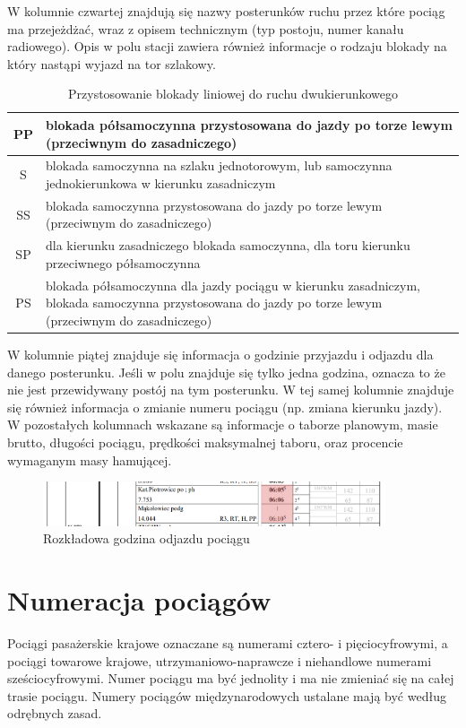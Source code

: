 W kolumnie czwartej znajdują się nazwy posterunków ruchu przez które pociąg ma przejeżdżać, wraz z opisem technicznym (typ postoju, numer kanału radiowego). Opis w polu stacji zawiera również informacje o rodzaju blokady na który nastąpi wyjazd na tor szlakowy. 
\begin{table}
	\begin{tabular}{|c|m{11cm}|}   
		\hline
		PP	& blokada półsamoczynna przystosowana do jazdy po torze lewym (przeciwnym do zasadniczego) \\ 
		\hline
		S	& blokada samoczynna na szlaku jednotorowym, lub samoczynna jednokierunkowa w kierunku zasadniczym \\ 
		\hline
		SS	& blokada samoczynna przystosowana do jazdy po torze lewym (przeciwnym do zasadniczego) \\ 
		\hline
		SP	& dla kierunku zasadniczego blokada samoczynna, dla toru kierunku przeciwnego półsamoczynna \\ 
		\hline
		PS	& blokada półsamoczynna dla jazdy pociągu w kierunku zasadniczym, blokada samoczynna przystosowana do jazdy po torze lewym (przeciwnym do zasadniczego) \\ 
		\hline
	\end{tabular} 
	\caption{Przystosowanie blokady liniowej do ruchu dwukierunkowego}
\end{table}
W kolumnie piątej znajduje się informacja o godzinie przyjazdu i odjazdu dla danego posterunku. Jeśli w polu znajduje się tylko jedna godzina, oznacza to że nie jest przewidywany postój na tym posterunku. W tej samej kolumnie znajduje się również informacja o zmianie numeru pociągu (np. zmiana kierunku jazdy). W pozostałych kolumnach wskazane są informacje o taborze planowym, masie brutto, długości pociągu, prędkości maksymalnej taboru, oraz procencie wymaganym masy hamującej.
\begin{figure}
	\includegraphics[width=0.9\textwidth]{skryptkierownik-img/rozklad-odjaz.png}
	\caption{Rozkładowa godzina odjazdu pociągu}
\end{figure}


\section{Numeracja pociągów}

Pociągi pasa­żerskie krajowe ozna­czane są nume­rami cztero- i pięcio­cyfro­wymi, a pociągi towa­rowe krajowe, utrzymaniowo-naprawcze i niehan­dlowe nume­rami sześcio­cyfro­wymi. Numer pociągu ma być jedno­lity i ma nie zmieniać się na całej trasie pociągu. Numery pociągów międzynaro­dowych usta­lane mają być według odrębnych zasad.

